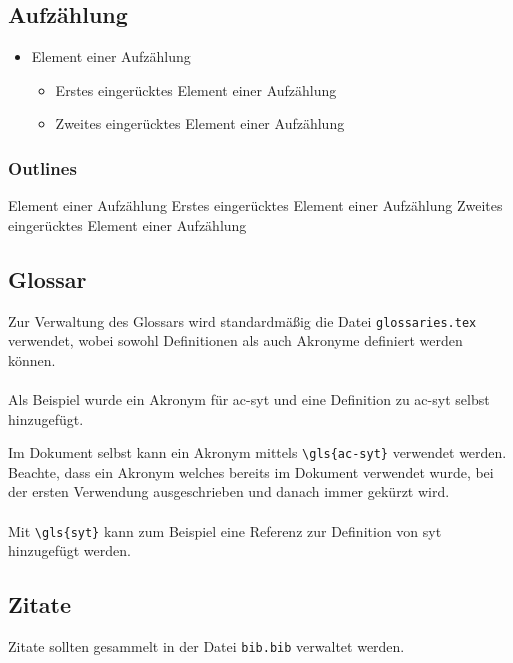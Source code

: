 \newpage
\subsection{Aufzählung}
\begin{itemize}
	\item Element einer Aufzählung
	\begin{itemize}
        \item Erstes eingerücktes Element einer Aufzählung
        \item Zweites eingerücktes Element einer Aufzählung
    \end{itemize}
\end{itemize}

\subsubsection{Outlines}
\begin{outline}
    \1 Element einer Aufzählung
        \2 Erstes eingerücktes Element einer Aufzählung
        \2 Zweites eingerücktes Element einer Aufzählung
\end{outline}

\subsection{Glossar}
Zur Verwaltung des Glossars wird standardmäßig die Datei \texttt{glossaries.tex} verwendet, wobei sowohl Definitionen als auch Akronyme definiert werden können.
\\\\
Als Beispiel wurde ein Akronym für \gls{ac-syt} und eine Definition zu \gls{ac-syt} selbst hinzugefügt.


Im Dokument selbst kann ein Akronym mittels \verb|\gls{ac-syt}| verwendet werden. Beachte, dass ein Akronym welches bereits im Dokument verwendet wurde, bei der ersten Verwendung ausgeschrieben und danach immer gekürzt wird.
\\\\
Mit \verb|\gls{syt}| kann zum Beispiel eine Referenz zur Definition von \gls{syt} hinzugefügt werden.

\subsection{Zitate}
Zitate sollten gesammelt in der Datei \texttt{bib.bib} verwaltet werden.


